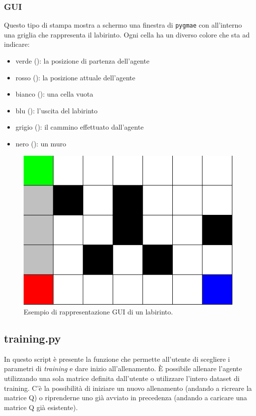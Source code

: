 \subsubsection{GUI}

Questo tipo di stampa mostra a schermo una finestra di \lstinline[style=cmd]|pygmae| con all'interno una griglia che rappresenta il labirinto. Ogni cella ha un diverso colore che sta ad indicare:

\begin{itemize}
	\item verde (\crule[green]{.5em}{.5em}): la posizione di partenza dell'agente
	\item rosso (\crule[red]{.5em}{.5em}): la posizione attuale dell'agente
	\item bianco (\crule[white]{.5em}{.5em}): una cella vuota 
	\item blu (\crule[blue]{.5em}{.5em}): l'uscita del labirinto
	\item grigio (\crule[lightgray]{.5em}{.5em}): il cammino effettuato dall'agente
	\item nero (\crule{.5em}{.5em}): un muro
\end{itemize}

\begin{figure}[H]
	\centering
	\includegraphics[width=.3\textwidth]{img/maze_gui.png}
	\caption{Esempio di rappresentazione GUI di un labirinto.}
\end{figure}

\subsection{training.py}
\label{sec:training}

In questo script \`{e} presente la funzione che permette all'utente di scegliere i parametri di \textit{training} e dare inizio all'allenamento. \`{E} possibile allenare l'agente utilizzando una sola matrice definita dall'utente o utilizzare l'intero dataset di training. C'\`{e} la possibilit\`{a} di iniziare un nuovo allenamento (andando a ricreare la matrice Q) o riprenderne uno gi\`{a} avviato in precedenza (andando a caricare una matrice Q gi\`{a} esistente).

